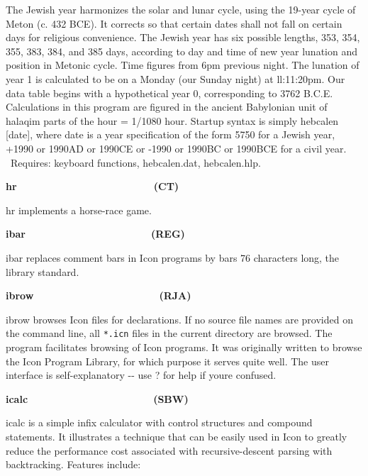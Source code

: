 The Jewish year harmonizes the solar and lunar cycle, using the 19-year
cycle of Meton (c. 432 BCE). It corrects so that certain dates shall
not fall on certain days for religious convenience. The Jewish year has
six possible lengths, 353, 354, 355, 383, 384, and 385 days, according
to day and time of new year lunation and position in Metonic cycle.
Time figures from 6pm previous night. The lunation of year 1 is
calculated to be on a Monday (our Sunday night) at ll:11:20pm. Our data
table begins with a hypothetical year 0, corresponding to 3762 B.C.E.
Calculations in this program are figured in the ancient Babylonian unit
of halaqim {\textquotedbl}parts{\textquotedbl} of the hour = 1/1080
hour. Startup syntax is simply \textsf{hebcalen [date]}, where
\textsf{date} is a year specification of the form 5750 for a Jewish
year, +1990 or 1990AD or 1990CE or -1990 or 1990BC or 1990BCE for a
civil year. \ Requires: keyboard functions,
\textsf{hebcalen.dat}, \textsf{hebcalen.hlp}.

{\sffamily\bfseries
hr\ \ \ \ \ \ \ \ \ \ \ \ \ \ \ \ \ \ \ \ \ \  \ \ (CT)}

\textsf{hr} implements a horse-race game.

{\sffamily\bfseries
ibar\ \ \ \ \ \ \ \ \ \ \ \ \ \ \ \ \ \ \ \ \ \ (REG)}

\textsf{ibar} replaces comment bars in Icon programs by
bars 76 characters long, the library standard. 

{\sffamily\bfseries
ibrow\ \ \ \ \ \ \ \ \ \ \ \ \ \ \ \ \ \ \ \ \ \ (RJA)}

\textsf{ibrow} browses Icon files for declarations. If no source file
names are provided on the command line, all \texttt{*.icn} files in the
current directory are browsed. The program facilitates browsing of Icon
programs. It was originally written to browse the Icon Program Library,
for which purpose it serves quite well. The user interface is
self-explanatory -{}- use {\textquotedbl}?{\textquotedbl} for help if
you{\textquotesingle}re confused.

{\sffamily\bfseries
icalc\ \ \ \ \ \ \ \ \ \ \ \ \ \ \ \ \ \ \ \ \ \ (SBW)}

\textsf{icalc} is a simple infix calculator with control structures and
compound statements. It illustrates a technique that can be easily used
in Icon to greatly reduce the performance cost associated with
recursive-descent parsing with backtracking.
Features include:


